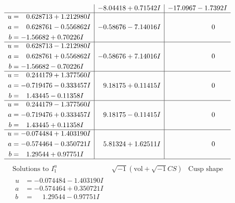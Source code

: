 \documentclass[1p]{elsarticle_modified}
\theoremstyle{definition}
\newcommand{\I}{\sqrt{-1}}
\begin{document}
$$\begin{array}{c|c|c}
 & -8.04418 + 0.71542 I & -17.0967 - 1.7392 I \\ \hline\begin{aligned}
u &= \phantom{-}0.628713 + 1.212980 I \\
a &= \phantom{-}0.628761 - 0.556862 I \\
b &= -1.56682 + 0.70226 I\end{aligned}
 & -0.58676 - 7.14016 I & \phantom{-0.000000 } 0 \\ \hline\begin{aligned}
u &= \phantom{-}0.628713 - 1.212980 I \\
a &= \phantom{-}0.628761 + 0.556862 I \\
b &= -1.56682 - 0.70226 I\end{aligned}
 & -0.58676 + 7.14016 I & \phantom{-0.000000 } 0 \\ \hline\begin{aligned}
u &= \phantom{-}0.244179 + 1.377560 I \\
a &= -0.719476 - 0.333457 I \\
b &= \phantom{-}1.43445 - 0.11358 I\end{aligned}
 & \phantom{-}9.18175 + 0.11415 I & \phantom{-0.000000 } 0 \\ \hline\begin{aligned}
u &= \phantom{-}0.244179 - 1.377560 I \\
a &= -0.719476 + 0.333457 I \\
b &= \phantom{-}1.43445 + 0.11358 I\end{aligned}
 & \phantom{-}9.18175 - 0.11415 I & \phantom{-0.000000 } 0 \\ \hline\begin{aligned}
u &= -0.074484 + 1.403190 I \\
a &= -0.574464 - 0.350721 I \\
b &= \phantom{-}1.29544 + 0.97751 I\end{aligned}
 & \phantom{-}5.81324 + 1.62511 I & \phantom{-0.000000 } 0\\
 \hline 
 \end{array}$$\newpage$$\begin{array}{c|c|c}  
\text{Solutions to }I^u_{1}& \I (\text{vol} + \sqrt{-1}CS) & \text{Cusp shape}\\
 \hline 
\begin{aligned}
u &= -0.074484 - 1.403190 I \\
a &= -0.574464 + 0.350721 I \\
b &= \phantom{-}1.29544 - 0.97751 I\end{aligned}

\end{array}$$
\end{document}
